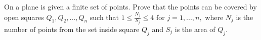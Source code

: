 On a plane is given a finite set of points. Prove that the points can be covered by open squares $Q_1,Q_2,...,Q_n$ such that $1 \le\frac{N_j}{S_j} \le 4$ for $j = 1,...,n,$ where $N_j$ is the number of points from the set inside square $Q_j$ and $S_j$ is the area of $Q_j$.